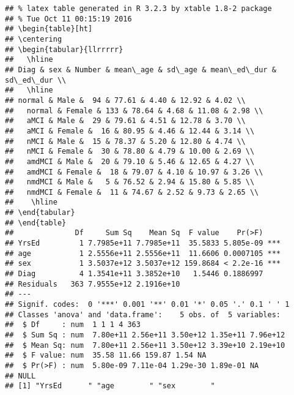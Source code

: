 \documentclass[12pt]{article}\usepackage[]{graphicx}\usepackage[]{color}
\makeatletter
\newenvironment{kframe}{%
 \def\at@end@of@kframe{}%
 \ifinner\ifhmode%
  \def\at@end@of@kframe{\end{minipage}}%
  \begin{minipage}{\columnwidth}%
 \fi\fi%
 \def\FrameCommand##1{\hskip\@totalleftmargin \hskip-\fboxsep
 \colorbox{shadecolor}{##1}\hskip-\fboxsep
     \hskip-\linewidth \hskip-\@totalleftmargin \hskip\columnwidth}%
 \MakeFramed {\advance\hsize-\width
   \@totalleftmargin\z@ \linewidth\hsize
   \@setminipage}}%
 {\par\unskip\endMakeFramed%
 \at@end@of@kframe}
\newenvironment{knitrout}{}{} %
\makeatother
\begin{document}
\begin{knitrout}
\color{fgcolor}\begin{kframe}
\begin{verbatim}
## % latex table generated in R 3.2.3 by xtable 1.8-2 package
## % Tue Oct 11 00:15:19 2016
## \begin{table}[ht]
## \centering
## \begin{tabular}{llrrrrr}
##   \hline
## Diag & sex & Number & mean\_age & sd\_age & mean\_ed\_dur & sd\_ed\_dur \\ 
##   \hline
## normal & Male &  94 & 77.61 & 4.40 & 12.92 & 4.02 \\ 
##   normal & Female & 133 & 78.64 & 4.68 & 11.08 & 2.98 \\ 
##   aMCI & Male &  29 & 79.61 & 4.51 & 12.78 & 3.70 \\ 
##   aMCI & Female &  16 & 80.95 & 4.46 & 12.44 & 3.14 \\ 
##   nMCI & Male &  15 & 78.37 & 5.20 & 12.80 & 4.74 \\ 
##   nMCI & Female &  30 & 78.80 & 4.79 & 10.00 & 2.69 \\ 
##   amdMCI & Male &  20 & 79.10 & 5.46 & 12.65 & 4.27 \\ 
##   amdMCI & Female &  18 & 79.07 & 4.10 & 10.97 & 3.26 \\ 
##   nmdMCI & Male &   5 & 76.52 & 2.94 & 15.80 & 5.85 \\ 
##   nmdMCI & Female &  11 & 74.67 & 2.52 & 9.73 & 2.65 \\ 
##    \hline
## \end{tabular}
## \end{table}
##              Df     Sum Sq    Mean Sq  F value    Pr(>F)    
## YrsEd         1 7.7985e+11 7.7985e+11  35.5833 5.805e-09 ***
## age           1 2.5556e+11 2.5556e+11  11.6606 0.0007105 ***
## sex           1 3.5037e+12 3.5037e+12 159.8684 < 2.2e-16 ***
## Diag          4 1.3541e+11 3.3852e+10   1.5446 0.1886997    
## Residuals   363 7.9555e+12 2.1916e+10                       
## ---
## Signif. codes:  0 '***' 0.001 '**' 0.01 '*' 0.05 '.' 0.1 ' ' 1
## Classes 'anova' and 'data.frame':	5 obs. of  5 variables:
##  $ Df     : num  1 1 1 4 363
##  $ Sum Sq : num  7.80e+11 2.56e+11 3.50e+12 1.35e+11 7.96e+12
##  $ Mean Sq: num  7.80e+11 2.56e+11 3.50e+12 3.39e+10 2.19e+10
##  $ F value: num  35.58 11.66 159.87 1.54 NA
##  $ Pr(>F) : num  5.80e-09 7.11e-04 1.29e-30 1.89e-01 NA
## NULL
## [1] "YrsEd      " "age        " "sex        "
\end{verbatim}
\end{kframe}
\end{knitrout}
\end{document}
